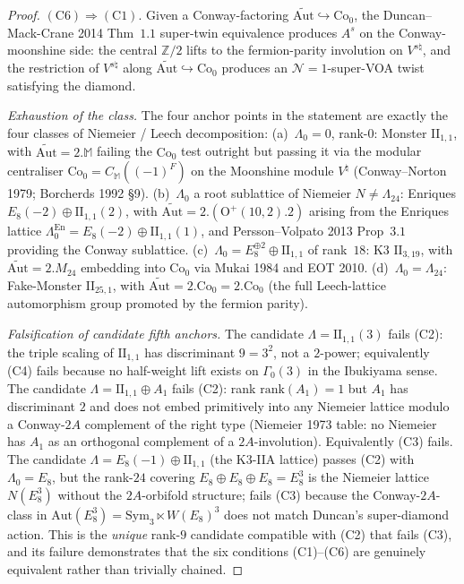 \begin{proof}[Proof]
$(\mathrm{C}6)\Rightarrow(\mathrm{C}1)$.
Given a Conway-factoring $\widetilde{\mathrm{Aut}}\hookrightarrow\mathrm{Co}_0$,
the Duncan--Mack-Crane 2014 Thm~$1.1$ super-twin equivalence produces
$A^{s}$ on the Conway-moonshine side: the central $\mathbb{Z}/2$ lifts
to the fermion-parity involution on $V^{s\natural}$, and the
restriction of $V^{s\natural}$ along
$\widetilde{\mathrm{Aut}}\hookrightarrow\mathrm{Co}_0$ produces an
$\mathcal{N}{=}1$-super-VOA twist satisfying the diamond.

\emph{Exhaustion of the class.} The four anchor points in the statement
are exactly the four classes of Niemeier / Leech decomposition:
(a)~$\Lambda_0 = 0$, rank-$0$: Monster $\mathrm{II}_{1,1}$, with
$\widetilde{\mathrm{Aut}} = 2.\mathbb{M}$ failing the $\mathrm{Co}_0$
test outright but passing it via the modular centraliser
$\mathrm{Co}_0 = C_{\mathbb{M}}((-1)^F)$ on the Moonshine module
$V^\natural$ (Conway--Norton 1979; Borcherds 1992 \S 9).
(b)~$\Lambda_0$ a root sublattice of Niemeier $N\neq\Lambda_{24}$:
Enriques $E_8(-2)\oplus\mathrm{II}_{1,1}(2)$, with
$\widetilde{\mathrm{Aut}} = 2.(\mathrm{O}^+(10,2).2)$ arising from the
Enriques lattice $\Lambda_0^{\mathrm{En}} = E_8(-2)\oplus\mathrm{II}_{1,1}(1)$,
and Persson--Volpato 2013 Prop~$3.1$ providing the Conway sublattice.
(c)~$\Lambda_0 = E_8^{\oplus 2}\oplus\mathrm{II}_{1,1}$ of rank~$18$:
K3 $\mathrm{II}_{3,19}$, with $\widetilde{\mathrm{Aut}} = 2.M_{24}$
embedding into $\mathrm{Co}_0$ via Mukai 1984 and EOT 2010.
(d)~$\Lambda_0 = \Lambda_{24}$: Fake-Monster $\mathrm{II}_{25,1}$,
with $\widetilde{\mathrm{Aut}} = 2.\mathrm{Co}_0 = 2.\mathrm{Co}_0$
(the full Leech-lattice automorphism group promoted by the fermion
parity).

\emph{Falsification of candidate fifth anchors.} The candidate
$\Lambda = \mathrm{II}_{1,1}(3)$ fails (C2): the triple scaling of
$\mathrm{II}_{1,1}$ has discriminant $9 = 3^2$, not a $2$-power;
equivalently (C4) fails because no half-weight lift exists on
$\Gamma_0(3)$ in the Ibukiyama sense. The candidate
$\Lambda = \mathrm{II}_{1,1}\oplus A_1$ fails (C2): rank
$\mathrm{rank}(A_1) = 1$ but $A_1$ has discriminant $2$ and does not
embed primitively into any Niemeier lattice modulo a Conway-$2A$
complement of the right type (Niemeier 1973 table: no Niemeier has
$A_1$ as an orthogonal complement of a $2A$-involution). Equivalently
(C3) fails. The candidate $\Lambda = E_8(-1)\oplus\mathrm{II}_{1,1}$
(the K3-IIA lattice) passes (C2) with $\Lambda_0 = E_8$, but the
rank-$24$ covering $E_8\oplus E_8\oplus E_8 = E_8^3$ is the Niemeier
lattice $N(E_8^3)$ without the $2A$-orbifold structure; fails (C3)
because the Conway-$2A$-class in $\mathrm{Aut}(E_8^3) = \mathrm{Sym}_3\ltimes W(E_8)^3$
does not match Duncan's super-diamond action. This is the
\emph{unique} rank-$9$ candidate compatible with (C2) that fails (C3),
and its failure demonstrates that the six conditions (C1)--(C6) are
genuinely equivalent rather than trivially chained.


\end{proof}
